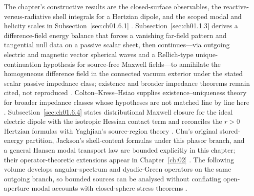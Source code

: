 The chapter's constructive results are the closed-surface observables, the reactive-versus-radiative shell integrals for a Hertzian dipole, and the scoped modal and helicity scales in Subsection~\ref{sec:ch01.6.1} \cite{stratton1941,harrington2001,chu1948}. Subsection~\ref{sec:ch01.1.3} derives a difference-field energy balance that forces a vanishing far-field pattern and tangential null data on a passive scalar sheet, then continues---via outgoing electric and magnetic vector spherical waves and a Rellich-type unique-continuation hypothesis for source-free Maxwell fields---to annihilate the homogeneous difference field in the connected vacuum exterior under the stated scalar passive impedance class; existence and broader impedance theorems remain cited, not reproduced \cite{sommerfeld1949,harrington2001}. Colton--Kress--Hsiao supplies existence--uniqueness theory for broader impedance classes whose hypotheses are not matched line by line here \cite{colton1981impedance}. Subsection~\ref{sec:ch01.6.4} states distributional Maxwell closure for the ideal electric dipole with the isotropic Hessian contact term and reconciles the $r>0$ Hertzian formulas with Yaghjian's source-region theory \cite{yaghjian1980dyadic,yaghjian1982}. Chu's original stored-energy partition, Jackson's shell-content formulas under this phasor branch, and a general Hansen modal transport law are bounded explicitly in this chapter; their operator-theoretic extensions appear in Chapter~\ref{ch:02} \cite{jackson1999,chu1948,tai1994}. The following volume develops angular-spectrum and dyadic-Green operators on the same outgoing branch, so bounded sources can be analysed without conflating open-aperture modal accounts with closed-sphere stress theorems \cite{harrington2001}.

